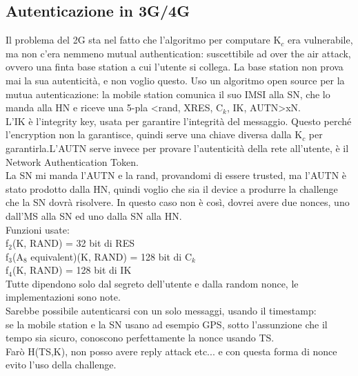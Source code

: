 \documentclass[16px]{article}
\begin{document}
\subsection{Autenticazione in 3G/4G}
Il problema del 2G sta nel fatto che l'algoritmo per computare K$_{c}$ era vulnerabile, ma non c'era nemmeno mutual authentication: suscettibile ad over the air attack, ovvero una finta base station a cui l'utente si collega. La base station non prova mai la sua autenticità, e non voglio questo. Uso un algoritmo open source per la mutua autenticazione:
la mobile station comunica il suo IMSI alla SN, che lo manda alla HN e riceve una 5-pla <rand, XRES, C$_{k}$, IK, AUTN>xN.\\ L'IK è l'integrity key, usata per garantire l'integrità del messaggio. Questo perché l'encryption non la garantisce, quindi serve una chiave diversa dalla K$_{c}$ per garantirla.L'AUTN serve invece per provare l'autenticità della rete all'utente, è il Network Authentication Token.\\ La SN mi manda l'AUTN e la rand, provandomi di essere trusted, ma l'AUTN è stato prodotto dalla HN, quindi voglio che sia il device a produrre la challenge che la SN dovrà risolvere. In questo caso non è così, dovrei avere due nonces, uno dall'MS alla SN ed uno dalla SN alla HN.\\ Funzioni usate:\\
f$_{2}$(K, RAND) = 32 bit di RES\\
f$_{3}$(A$_{8}$ equivalent)(K, RAND) = 128 bit di C$_{k}$\\
f$_{4}$(K, RAND) = 128 bit di IK\\
Tutte dipendono solo dal segreto dell'utente e dalla random nonce, le implementazioni sono note.\\ Sarebbe possibile autenticarsi con un solo messaggi, usando il timestamp:\\
se la mobile station e la SN usano ad esempio GPS, sotto l'assunzione che il tempo sia sicuro, conoscono perfettamente la nonce usando TS.\\ Farò H(TS,K), non posso avere reply attack etc... e con questa forma di nonce evito l'uso della challenge.
\end{document}
